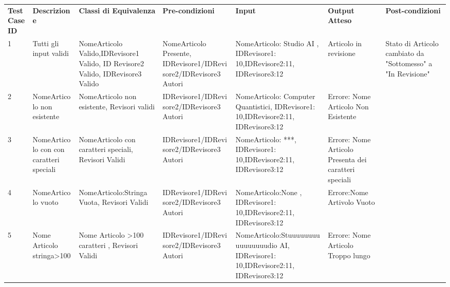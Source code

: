 \begin{sidewaystable}
\begin{tabular}{|p{3cm}|p{2cm}|p{2cm}|p{2cm}|p{4cm}|p{2cm}|p{2cm}|}
\hline
\rowcolor{SkyBlue}
  \multicolumn{7}{l}{\textbf{Test Suite: Assegna Revisore 2}}\\
\hline
\rowcolor{Red}
\textbf{Test Case ID} & \textbf{Descrizione} & \textbf{Classi di Equivalenza} & \textbf{Pre-condizioni} & \textbf{Input} & \textbf{Output Atteso} & \textbf{Post-condizioni} \\
\hline
1& Tutti gli input validi &NomeArticolo Valido,IDRevisore1 Valido, ID Revisore2 Valido, IDRevisore3 Valido&NomeArticolo Presente, IDRevisore1/IDRevisore2/IDRevisore3 Autori& NomeArticolo: Studio AI , IDRevisore1: 10,IDRevisore2:11, IDRevisore3:12&Articolo in revisione& Stato di Articolo cambiato da "Sottomesso" a "In Revisione"\\
\hline
2& NomeArticolo non esistente&NomeArticolo non esistente, Revisori validi& IDRevisore1/IDRevisore2/IDRevisore3 Autori& NomeArticolo: Computer Quantistici, IDRevisore1: 10,IDRevisore2:11, IDRevisore3:12&Errore: Nome Articolo Non Esistente&\\
\hline
3& NomeArticolo con con caratteri speciali& NomeArticolo con caratteri speciali, Revisori Validi & IDRevisore1/IDRevisore2/IDRevisore3 Autori& NomeArticolo: ***, IDRevisore1: 10,IDRevisore2:11, IDRevisore3:12&Errore: Nome Articolo Presenta dei caratteri speciali &\\
\hline
4&NomeArticolo vuoto & NomeArticolo:Stringa Vuota, Revisori Validi & IDRevisore1/IDRevisore2/IDRevisore3 Autori& NomeArticolo:None , IDRevisore1: 10,IDRevisore2:11, IDRevisore3:12&Errore:Nome Artivolo Vuoto&\\
\hline
5&Nome Articolo stringa>100 &Nome Articolo >100 caratteri , Revisori Validi & IDRevisore1/IDRevisore2/IDRevisore3 Autori&NomeArticolo:Stuuuuuuuuuuuuuuuudio AI,  IDRevisore1: 10,IDRevisore2:11, IDRevisore3:12&Errore: Nome Articolo Troppo lungo&\\
\hline 
\end{tabular}
\end{sidewaystable}

